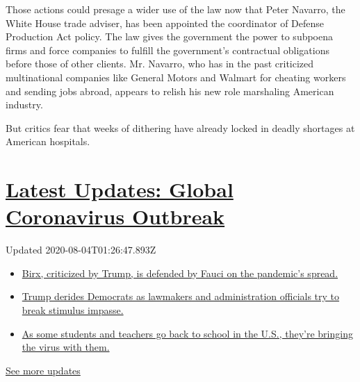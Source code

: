 Those actions could presage a wider use of the law now that Peter
Navarro, the White House trade adviser, has been appointed the
coordinator of Defense Production Act policy. The law gives the
government the power to subpoena firms and force companies to fulfill
the government's contractual obligations before those of other clients.
Mr. Navarro, who has in the past criticized multinational companies like
General Motors and Walmart for cheating workers and sending jobs abroad,
appears to relish his new role marshaling American industry.

But critics fear that weeks of dithering have already locked in deadly
shortages at American hospitals.

\hypertarget{latest-updates-global-coronavirus-outbreak}{%
\section{\texorpdfstring{\href{https://www.nytimes.com/2020/08/03/world/coronavirus-covid-19.html?action=click\&pgtype=Article\&state=default\&region=MAIN_CONTENT_1\&context=storylines_live_updates}{Latest
Updates: Global Coronavirus
Outbreak}}{Latest Updates: Global Coronavirus Outbreak}}\label{latest-updates-global-coronavirus-outbreak}}

Updated 2020-08-04T01:26:47.893Z

\begin{itemize}
\tightlist
\item
  \href{https://www.nytimes.com/2020/08/03/world/coronavirus-covid-19.html?action=click\&pgtype=Article\&state=default\&region=MAIN_CONTENT_1\&context=storylines_live_updates\#link-4e40df05}{Birx,
  criticized by Trump, is defended by Fauci on the pandemic's spread.}
\item
  \href{https://www.nytimes.com/2020/08/03/world/coronavirus-covid-19.html?action=click\&pgtype=Article\&state=default\&region=MAIN_CONTENT_1\&context=storylines_live_updates\#link-15e7f995}{Trump
  derides Democrats as lawmakers and administration officials try to
  break stimulus impasse.}
\item
  \href{https://www.nytimes.com/2020/08/03/world/coronavirus-covid-19.html?action=click\&pgtype=Article\&state=default\&region=MAIN_CONTENT_1\&context=storylines_live_updates\#link-4c85ed64}{As
  some students and teachers go back to school in the U.S., they're
  bringing the virus with them.}
\end{itemize}

\href{https://www.nytimes.com/2020/08/03/world/coronavirus-covid-19.html?action=click\&pgtype=Article\&state=default\&region=MAIN_CONTENT_1\&context=storylines_live_updates}{See
more updates}

